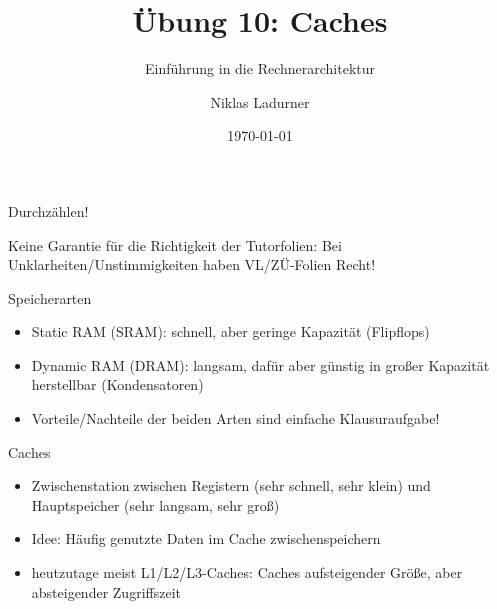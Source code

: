 \documentclass[
  german,            %
  aspectratio=169,    %
]{tumbeamer}
\title{Übung 10: Caches}
\subtitle{Einführung in die Rechnerarchitektur}
\author{Niklas Ladurner}
\institute{\theChairName\\\theDepartmentName\\\theUniversityName}
\date[\today]{\today}
\begin{document}
\maketitle

\begin{frame}[c]{}{}
  \begin{center}
    \LARGE  Durchzählen!
  \end{center}
\end{frame}

\begin{frame}[c]{}{}
  \begin{center}
    \LARGE  Keine Garantie für die Richtigkeit der Tutorfolien: Bei Unklarheiten/Unstimmigkeiten
    haben VL/ZÜ-Folien Recht!
  \end{center}
\end{frame}

\begin{frame}[fragile, c]{Speicherarten}{}
  \begin{itemize}
    \item Static RAM (SRAM): schnell, aber geringe Kapazität (Flipflops)
    \item Dynamic RAM (DRAM): langsam, dafür aber günstig in großer Kapazität herstellbar (Kondensatoren)
    \item Vorteile/Nachteile der beiden Arten sind einfache Klausuraufgabe!
  \end{itemize}

\end{frame}

\begin{frame}[fragile, c]{Caches}{}
  \begin{itemize}
    \item \glqq Zwischenstation\grqq $\;$zwischen Registern (sehr schnell, sehr klein) und Hauptspeicher (sehr langsam, sehr groß)
    \item Idee: Häufig genutzte Daten im Cache zwischenspeichern
    \item heutzutage meist L1/L2/L3-Caches: Caches aufsteigender Größe, aber absteigender Zugriffszeit 
  \end{itemize}
\end{frame}
\end{document}

